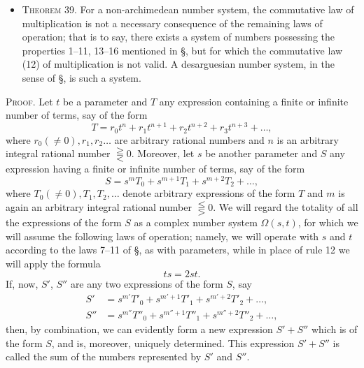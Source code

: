 \documentclass[11pt,oneside]{book}
\begin{document}
\label{p33}

\begin{itemize}
\item[]{\scshape Theorem 39.} For a non-archimedean number
system, the commutative law of multiplication
is not a necessary consequence of the remaining
laws of operation; that is to say, there exists
a system of numbers possessing the properties
1--11, 13--16 mentioned in \S{}, but for
which the commutative law (12) of multiplication
is not valid. A desarguesian number system,
in the sense of \S{}, is such a system.
\end{itemize}

{\scshape Proof}. Let $t$ be a parameter and $T$ any expression
containing a finite or infinite number of terms,
say of the form
\[
T=r_0t^n + r_1t^{n+1} + r_2t^{n+2} + r_3t^{n+3} + \ldots,
\]
where $r_0(\neq 0), r_1, r_2 \ldots$ are arbitrary rational numbers
and $n$ is an arbitrary integral rational number
$\gtreqqless 0$. Moreover, let $s$ be another parameter and $S$ any
expression having a finite or infinite number of terms,
say of the form
\begin{equation*}
 S = s^mT_0 + s^{m+1}T_1 + s^{m+2}T_2 + \ldots ,
\end{equation*}
where $T_0 (\ne 0), T_1, T_2, \ldots $ denote arbitrary expressions
of the form $T$ and $m$ is again an arbitrary integral
rational number $\lesseqqgtr 0$. We will regard the totality of
all the expressions of the form $S$ as a complex number
system $\Omega(s,\!t)$, for which we will assume the following
laws of operation; namely, we will operate
with $s$ and $t$ according to the laws 7--11 of \S{}, as
with parameters, while in place of rule 12 we will apply
the formula
\begin{equation}
ts = 2st.
\end{equation}
If, now, $S'$, $S''$ are any two expressions of the form
$S$, say
\begin{align*}
 S' &= s^{m'}T'_0 + s^{m'+1}T'_1 + s^{m'+2}T'_2 + \ldots,\\
 S'' &= s^{m''}T''_0 + s^{m''+1}T''_1 + s^{m''+2}T''_2 + \ldots,
\end{align*}
then, by combination, we can evidently form a new expression
$S'+S''$ which is of the form $S$, and is, moreover,
uniquely determined. This expression $S' + S''$
is called the sum of the numbers represented by $S'$
and $S''$.
\end{document}
